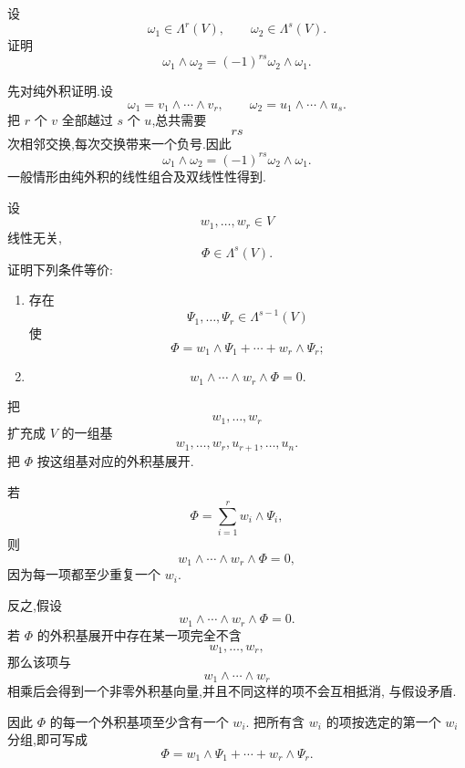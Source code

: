 \begin{example}[\markstar]
设
\[
\omega_1\in\Lambda^r(V),
\qquad
\omega_2\in\Lambda^s(V).
\]
证明
\[
\boxed{
\omega_1\wedge\omega_2
=
(-1)^{rs}
\omega_2\wedge\omega_1.
}
\]
\end{example}
\exampleblank

\begin{solution}
先对纯外积证明.设
\[
\omega_1=v_1\wedge\cdots\wedge v_r,
\qquad
\omega_2=u_1\wedge\cdots\wedge u_s.
\]
把 $r$ 个 $v$ 全部越过 $s$ 个 $u$,总共需要
\[
rs
\]
次相邻交换,每次交换带来一个负号.因此
\[
\omega_1\wedge\omega_2
=
(-1)^{rs}
\omega_2\wedge\omega_1.
\]
一般情形由纯外积的线性组合及双线性性得到.
\end{solution}


\begin{example}[\markstar]
设
\[
w_1,\ldots,w_r\in V
\]
线性无关,
\[
\Phi\in\Lambda^s(V).
\]
证明下列条件等价:
\begin{enumerate}
    \item 存在
    \[
    \Psi_1,\ldots,\Psi_r\in\Lambda^{s-1}(V)
    \]
    使
    \[
    \Phi
    =
    w_1\wedge\Psi_1+\cdots+w_r\wedge\Psi_r;
    \]
    \item
    \[
    w_1\wedge\cdots\wedge w_r\wedge\Phi=0.
    \]
\end{enumerate}
\end{example}
\exampleblank

\begin{solution}
把
\[
w_1,\ldots,w_r
\]
扩充成 $V$ 的一组基
\[
w_1,\ldots,w_r,u_{r+1},\ldots,u_n.
\]
把 $\Phi$ 按这组基对应的外积基展开.

若
\[
\Phi
=
\sum\limits_{i=1}^{r}w_i\wedge\Psi_i,
\]
则
\[
w_1\wedge\cdots\wedge w_r\wedge\Phi=0,
\]
因为每一项都至少重复一个 $w_i$.

反之,假设
\[
w_1\wedge\cdots\wedge w_r\wedge\Phi=0.
\]
若 $\Phi$ 的外积基展开中存在某一项完全不含
\[
w_1,\ldots,w_r,
\]
那么该项与
\[
w_1\wedge\cdots\wedge w_r
\]
相乘后会得到一个非零外积基向量,并且不同这样的项不会互相抵消,
与假设矛盾.

因此 $\Phi$ 的每一个外积基项至少含有一个 $w_i$.
把所有含 $w_i$ 的项按选定的第一个 $w_i$ 分组,即可写成
\[
\Phi
=
w_1\wedge\Psi_1+\cdots+w_r\wedge\Psi_r.
\]
\end{solution}
